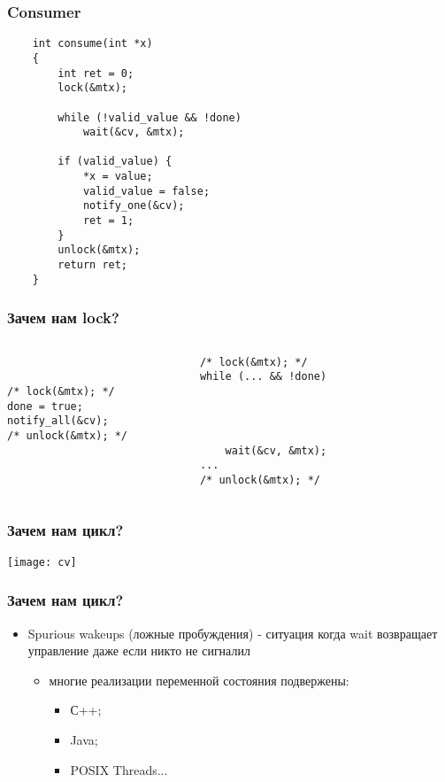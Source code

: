 \begin{frame}[fragile]
\frametitle{Consumer}
\begin{lstlisting}
    int consume(int *x)
    {
        int ret = 0;
        lock(&mtx);

        while (!valid_value && !done)
            wait(&cv, &mtx);

        if (valid_value) {
            *x = value;
            valid_value = false;
            notify_one(&cv);
            ret = 1;
        }
        unlock(&mtx);
        return ret;
    }
\end{lstlisting}
\end{frame}

\begin{frame}[fragile]
\frametitle{Зачем нам lock?}
\begin{columns}
    \begin{column}{.4\textwidth}
        \begin{lstlisting}


/* lock(&mtx); */
done = true;
notify_all(&cv);
/* unlock(&mtx); */



        \end{lstlisting}
    \end{column}
    \begin{column}{.4\textwidth}
        \begin{lstlisting}
/* lock(&mtx); */
while (... && !done)




    wait(&cv, &mtx);
...
/* unlock(&mtx); */
        \end{lstlisting}
    \end{column}
    \begin{column}{.2\textwidth}
    \end{column}
\end{columns}
\end{frame}

\begin{frame}
\frametitle{Зачем нам цикл?}
\texttt{[image: cv]}
\end{frame}

\begin{frame}
\frametitle{Зачем нам цикл?}
\begin{itemize}
    \item<1->Spurious wakeups (ложные пробуждения) - ситуация когда wait
         возвращает управление даже если никто не сигналил
    \begin{itemize}
        \item<2->многие реализации переменной состояния подвержены:
        \begin{itemize}
            \item<3->С++;
            \item<4->Java;
            \item<5->POSIX Threads...
        \end{itemize}
    \end{itemize}
\end{itemize}
\end{frame}
